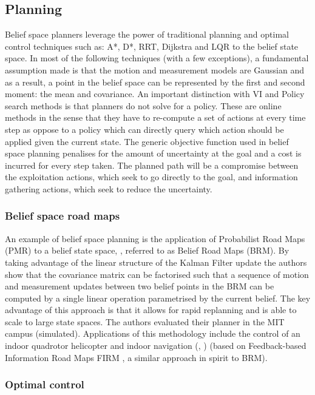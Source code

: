 \subsection{Planning}\label{lit:Planning}

Belief space planners leverage the power of traditional planning and optimal control techniques such as: A*, D*, RRT, Dijkstra and LQR to the belief state space. 
In most of the following techniques (with a few exceptions), a fundamental assumption made is that the motion and measurement models are Gaussian 
and as a result, a point in the belief space can be represented by the first and second moment: the mean and covariance. An important distinction with VI and Policy search methods is that planners
do not solve for a policy. These are online methods in the sense that they have to re-compute a set of 
actions at every time step as oppose to a policy which can directly query which action should be applied given the current state. 
The generic objective function used in belief space planning penalises for the amount of uncertainty at the goal and a cost is incurred 
for every step taken. The planned path will be a compromise between the exploitation actions, which seek to go directly to the goal, and information gathering actions, which seek to reduce the uncertainty.

\subsubsection{Belief space road maps}

An example of belief space planning is the application of Probabilist Road Maps (PMR) to a belief state space, \cite{BelRoadMap_2009}, referred to as Belief Road Maps (BRM). By taking advantage of the linear structure of the Kalman Filter update the authors show that the covariance matrix can be factorised such that a sequence of motion and measurement updates between two belief points in the BRM can be computed by a single linear operation parametrised by the current belief. 
The key advantage of this approach is that it allows for rapid replanning and is able to scale to large state spaces. 
The authors evaluated their planner in the MIT campus (simulated). Applications of this methodology include the control of an indoor 
quadrotor helicopter \cite{Quadrator_2008} and indoor navigation (\cite{FIRM_2011}, \cite{rob_online_bs_icra_2014}) 
(based on Feedback-based Information Road Maps FIRM , a similar approach in spirit to BRM).

\subsubsection{Optimal control}

